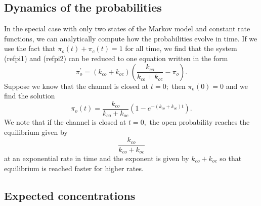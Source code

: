 

\subsection{Dynamics of the probabilities}

In the special case with only two states of the Markov model and constant
rate functions, we can analytically compute how the probabilities evolve in
time. If we use the fact that $\pi_{o}\left(  t\right)  +\pi_{c}\left(
t\right)  =1$ for all time, we find that the system (ref{pi1})
and (ref{pi2}) can be reduced to one equation written in the form
\begin{equation}
\pi_{o}^{\prime}=\left(  k_{co}+k_{oc}\right)  \left(  \frac{k_{co}}
{k_{co}+k_{oc}}-\pi_{o}\right)  . \label{pi_o}
\end{equation}
Suppose we know that the channel is closed at $t=0;$ then $\pi_{o}(0)=0$ and
we find the solution
\begin{equation}
\pi_{o}(t)=\frac{k_{co}}{k_{co}+k_{oc}}\left(  1-e^{-\left(  k_{co}
+k_{oc}\right)  t}\right)  .\label{pio11}
\end{equation}
We note that if the channel is closed at $t=0,$ the open probability reaches
the equilibrium given by 
\[ \frac{k_{co}}{k_{co}+k_{oc}}\]
at an exponential rate in
time and the exponent is given by $ k_{co}+k_{oc}$ so
that equilibrium is reached faster for higher rates.


\subsection{Expected concentrations}

